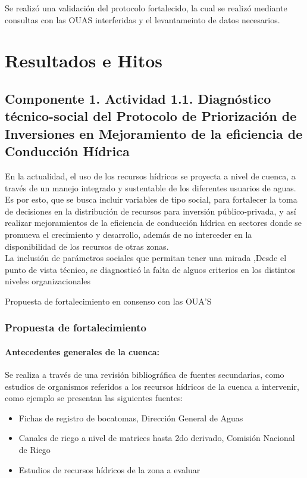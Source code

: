 \documentclass[]{article}
\begin{document}
Se realizó una validación del protocolo fortalecido, la cual se realizó mediante consultas con las OUAS interferidas y el levantameinto de datos necesarios.


\clearpage
\section{Resultados e Hitos}

\subsection{Componente 1. Actividad 1.1. Diagnóstico técnico-social del Protocolo de Priorización de Inversiones en Mejoramiento de la eficiencia de Conducción Hídrica}

En la actualidad, el uso de los recursos hídricos se proyecta a nivel de cuenca, a través de un manejo integrado y sustentable de los diferentes usuarios de aguas. Es por esto, que se busca incluir variables de tipo social, para fortalecer la toma de decisiones en la distribución de recursos para inversión público-privada, y así realizar mejoramientos de la eficiencia de conducción hídrica en sectores donde se promueva el crecimiento y desarrollo, además de no interceder en la disponibilidad de los recursos de otras zonas.\\

La inclusión de parámetros sociales que permitan tener una mirada ,Desde el punto de vista técnico, se diagnosticó la falta de alguos criterios en los distintos niveles organizacionales

Propuesta de fortalecimiento en consenso con las OUA'S

\subsubsection{Propuesta de fortalecimiento}




\paragraph{Antecedentes generales de la cuenca:}

Se realiza a través de una revisión bibliográfica de fuentes secundarias, como estudios de organismos referidos a los recursos hídricos de la cuenca a intervenir, como ejemplo se presentan las siguientes fuentes:\\

\begin{itemize}
\item Fichas de registro de bocatomas, Dirección General de Aguas
\item Canales de riego a nivel de matrices hasta 2do derivado, Comisión Nacional de Riego
\item Estudios de recursos hídricos de la zona a evaluar
\end{itemize}
\end{document}
